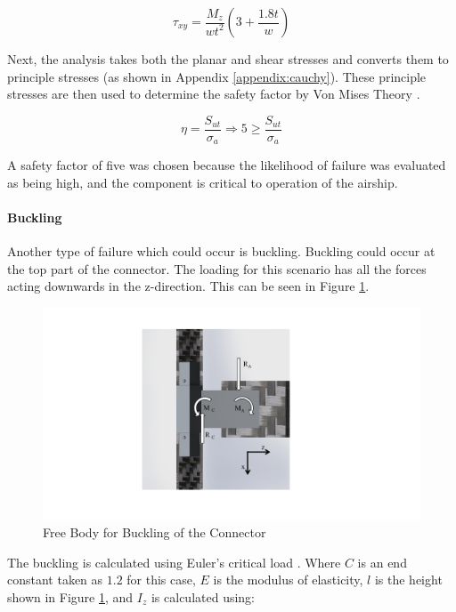 \documentclass[../main.tex]{subfiles}
\begin{document}
\begin{equation} \label{eqn:armtorsionShear}
\tau_{xy} = \dfrac{M_{z}}{wt^2}(3+\frac{1.8t}{w})
\end{equation}

Next, the analysis takes both the planar and shear stresses and converts them to principle stresses (as shown in Appendix \ref{appendix:cauchy}). These principle stresses are then used to determine the safety factor by Von Mises Theory \cite[221]{shigley}.

\begin{equation}
\eta = \dfrac{S_{ut}}{\sigma _a} \Rightarrow 5 \geq \dfrac{S_{ut}}{\sigma _a}
\end{equation}

A safety factor of five was chosen because the likelihood of failure was evaluated as being high, and the component is critical to operation of the airship.

\paragraph*{Buckling}

Another type of failure which could occur is buckling. Buckling could occur at the top part of the connector. The loading for this scenario has all the forces acting downwards in the z-direction. This can be seen  in Figure \ref{fig:armConnectorBuck}.

\begin{figure}[H]
	\centering
	\includegraphics[page={2}, width=.8\linewidth]{img/analysis/arm/armConnector.pdf}
	\caption{Free Body for Buckling of the Connector}
	\label{fig:armConnectorBuck}
\end{figure}

The buckling is calculated using Euler's critical load \cite[178]{shigley}. Where $C$ is an end constant taken as $1.2$ for this case, $E$ is the modulus of elasticity, $l$ is the height shown in Figure \ref{fig:armConnectorBuck}, and $I_z$ is calculated using: 
\end{document}
